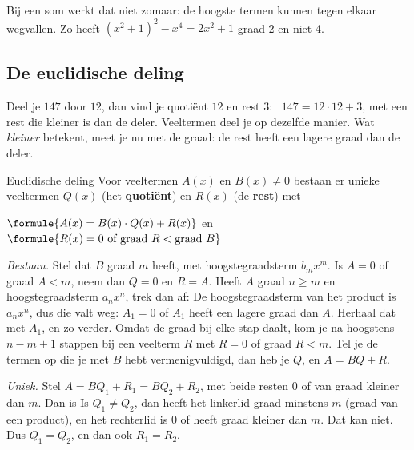 Bij een som werkt dat niet zomaar: de hoogste termen kunnen tegen elkaar wegvallen. Zo heeft $(x^2 + 1)^2 - x^4 = 2x^2 + 1$ graad 2 en niet 4.

\begin{oefeningen}
\end{oefeningen}

\subsection{De euclidische deling}

Deel je $147$ door $12$, dan vind je quotiënt $12$ en rest $3$: \ $147 = 12 \cdot 12 + 3$, met een rest die kleiner is dan de deler. Veeltermen deel je op dezelfde manier. Wat \textit{kleiner} betekent, meet je nu met de graad: de rest heeft een lagere graad dan de deler.

\begin{theorie}
\begin{stelling}{Euclidische deling}
Voor veeltermen $A(x)$ en $B(x) \neq 0$ bestaan er unieke veeltermen $Q(x)$ (het \textbf{\textcolor{accent}{quotiënt}}) en $R(x)$ (de \textbf{\textcolor{accent}{rest}}) met

\qquad $\formule{A(x) = B(x) \cdot Q(x) + R(x)}$ \quad en \quad $\formule{R(x) = 0 \text{ of graad } R < \text{graad } B}$
\end{stelling}

\begin{bewijs}
\textit{Bestaan.} Stel dat $B$ graad $m$ heeft, met hoogstegraadsterm $b_m x^m$. Is $A = 0$ of graad $A < m$, neem dan $Q = 0$ en $R = A$. Heeft $A$ graad $n \geqslant m$ en hoogstegraadsterm $a_n x^n$, trek dan af:
De hoogstegraadsterm van het product is $a_n x^n$, dus die valt weg: $A_1 = 0$ of $A_1$ heeft een lagere graad dan $A$. Herhaal dat met $A_1$, en zo verder. Omdat de graad bij elke stap daalt, kom je na hoogstens $n - m + 1$ stappen bij een veelterm $R$ met $R = 0$ of graad $R < m$. Tel je de termen op die je met $B$ hebt vermenigvuldigd, dan heb je $Q$, en $A = BQ + R$.

\textit{Uniek.} Stel $A = BQ_1 + R_1 = BQ_2 + R_2$, met beide resten $0$ of van graad kleiner dan $m$. Dan is
Is $Q_1 \neq Q_2$, dan heeft het linkerlid graad minstens $m$ (graad van een product), en het rechterlid is $0$ of heeft graad kleiner dan $m$. Dat kan niet. Dus $Q_1 = Q_2$, en dan ook $R_1 = R_2$.
\end{bewijs}
\end{theorie}

